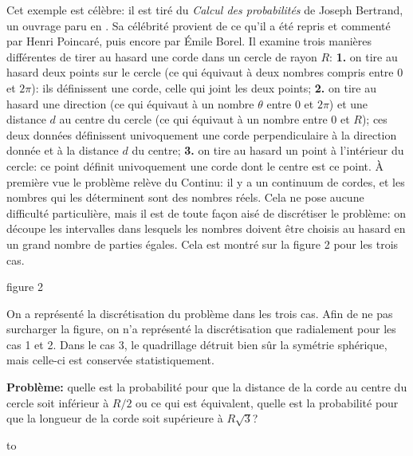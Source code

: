 \medskip 
Cet exemple est c\'el\`ebre: il est tir\'e du {\it Calcul des 
probabilit\'es} de Joseph Bertrand, un ouvrage paru en {}. 
Sa c\'el\'ebrit\'e provient de ce qu'il a \'et\'e repris et comment\'e 
par Henri Poincar\'e, puis encore par \'Emile Borel. Il examine trois
mani\`eres diff\'erentes de tirer au hasard une corde dans un cercle 
de rayon $R$: 
\smallskip 
{\bf 1.} on tire au hasard deux points sur le cercle (ce qui \'equivaut 
\`a deux nombres compris entre 0 et $2\pi$): ils d\'efinissent une corde,  
celle qui joint les deux points; 
\smallskip 
{\bf 2.} on tire au hasard une direction (ce qui \'equivaut \`a un nombre 
$\theta$ entre 0 et $2\pi$) et une distance $d$ au centre du cercle (ce  
qui \'equivaut \`a un nombre entre 0 et $R$); ces deux donn\'ees 
d\'efinissent univoquement une corde perpendiculaire \`a la direction 
donn\'ee et \`a la distance $d$ du centre;  
\smallskip   
{\bf 3.} on tire au hasard un point \`a l'int\'erieur du cercle: ce point  
d\'efinit univoquement une corde dont le centre est ce point.  
\medskip 
\`A premi\`ere vue le probl\`eme rel\`eve du Continu: il y a un continuum  
de cordes, et les nombres qui les d\'eterminent sont des nombres 
r\'eels. Cela ne pose aucune difficult\'e particuli\`ere, mais il est de 
toute fa\c con ais\'e de discr\'etiser le probl\`eme: on d\'ecoupe les 
intervalles dans  lesquels les nombres doivent \^etre choisis au hasard 
en un grand nombre  de parties \'egales. Cela est montr\'e sur la figure 2 
pour les trois cas. 
 
\midinsert 
\vskip3pt 
\centerline{ }  
\vskip3mm 
\centerline{\eightpoint figure 2} 
\vskip6pt 
\centerline{\vbox{\hsize=12cm \eightpoint On a repr\'esent\'e la 
discr\'etisation du probl\`eme dans les trois cas. Afin de ne pas  
surcharger la figure, on n'a repr\'esent\'e la discr\'etisation que 
radialement pour les cas 1 et 2. Dans le cas 3, le quadrillage d\'etruit 
bien s\^ur la sym\'etrie sph\'erique, mais celle-ci est conserv\'ee 
statistiquement. }}  
\vskip3mm 
 
 \endinsert 
 
{\bf Probl\`eme:} quelle est la probabilit\'e pour que la distance de la  
corde au centre du cercle soit inf\'erieur \`a $R/2$ ou ce qui est 
\'equivalent, quelle  est la probabilit\'e pour que la longueur de la 
corde soit sup\'erieure \`a $R\sqrt{3}$? 
 
\midinsert 
\vbox to  
\endinsert 

